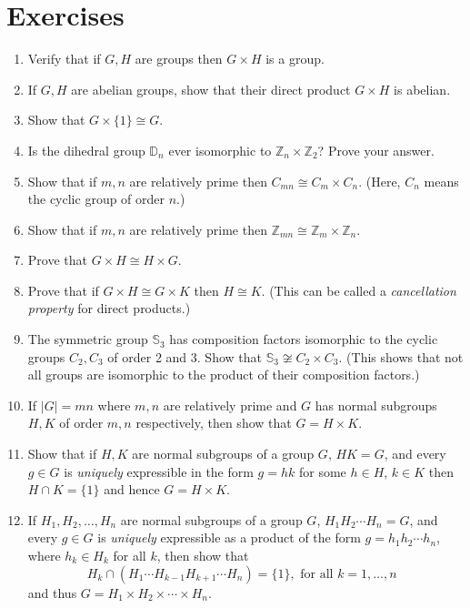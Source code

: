 \documentclass[11pt,oneside]{article}
\newenvironment{problems}
{
 \begin{enumerate}[topsep=1pt,itemsep=0pt,parsep=2pt,leftmargin=0.6cm,%
 label={\arabic*.}, ref=\arabic*] \small
}
{
 \end{enumerate}
}
\theoremstyle{definition}
\newcommand{\Z}{\mathbb{Z}} %
\newcommand{\Sym}{\mathbb{S}}
\newcommand{\D}{\mathbb{D}}
\begin{document}
\section*{Exercises}
\begin{problems}
\item Verify that if $G,H$ are groups then $G \times H$ is a group.


\item If $G, H$ are abelian groups, show that their direct product $G
  \times H$ is abelian.

\item Show that $G \times \{1\} \cong G$.

\item Is the dihedral group $\D_n$ ever isomorphic to $\Z_n \times
  \Z_2$? Prove your answer.

\item Show that if $m,n$ are relatively prime then $C_{mn} \cong C_m
  \times C_n$. (Here, $C_n$ means the cyclic group of order $n$.)

\item Show that if $m,n$ are relatively prime then $\Z_{mn} \cong \Z_m
  \times \Z_n$.

\item Prove that $G \times H \cong H \times G$.

\item Prove that if $G \times H \cong G \times K$ then $H \cong
  K$. (This can be called a \emph{cancellation property} for direct
  products.)


\item The symmetric group $\Sym_3$ has composition factors isomorphic
  to the cyclic groups $C_2, C_3$ of order 2 and 3. Show that $\Sym_3
  \not\cong C_2 \times C_3$. (This shows that not all groups are
  isomorphic to the product of their composition factors.)

\item If $|G| = mn$ where $m,n$ are relatively prime and $G$ has
  normal subgroups $H,K$ of order $m,n$ respectively, then show that
  $G = H \times K$.

\item Show that if $H,K$ are normal subgroups of a group $G$, $HK =
  G$, and every $g \in G$ is \emph{uniquely} expressible in the form
  $g = hk$ for some $h \in H$, $k \in K$ then $H \cap K = \{1\}$ and
  hence $G = H \times K$.

\item If $H_1, H_2, \dots, H_n$ are normal subgroups of a
  group $G$, $H_1H_2 \cdots H_n = G$, and every $g \in G$ is
  \emph{uniquely} expressible as a product of the form $g =h_1 h_2
  \cdots h_n$, where $h_k \in H_k$ for all $k$, then show that
  \[
  H_k \cap (H_1 \cdots H_{k-1} H_{k+1} \cdots H_n) = \{1\}, \text{ for
    all $k = 1, \dots, n$ }
  \] 
  and thus $G = H_1 \times H_2 \times \cdots \times H_n$.


\end{problems}
\end{document}
